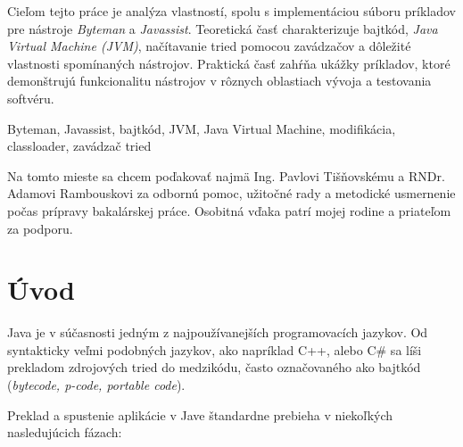 \documentclass[11pt,final,oneside]{fithesis}
\begin{document}
\FrontMatter
\ThesisTitlePage

\begin{ThesisDeclaration}
\DeclarationText
\AdvisorName
\end{ThesisDeclaration}

\begin{ThesisAbstract}
Cieľom tejto práce je analýza vlastností, spolu s implementáciou súboru
príkladov pre nástroje \textit{Byteman} a \textit{Javassist}. Teoretická časť 
charakterizuje bajtkód, \textit{Java Virtual Machine (JVM)}, načítavanie tried
pomocou zavádzačov a dôležité vlastnosti spomínaných nástrojov. Praktická časť 
zahŕňa ukážky príkladov, ktoré demonštrujú funkcionalitu nástrojov v rôznych 
oblastiach vývoja a testovania softvéru.
\end{ThesisAbstract}

\begin{ThesisKeyWords}
Byteman, Javassist, bajtkód, JVM, Java Virtual Machine, modifikácia, 
classloader, zavádzač tried
\end{ThesisKeyWords}

\begin{ThesisThanks}
Na tomto mieste sa chcem poďakovať najmä Ing. Pavlovi Tišňovskému a RNDr. 
Adamovi Rambouskovi za odbornú pomoc, užitočné rady a metodické usmernenie 
počas prípravy bakalárskej práce. Osobitná vďaka patrí mojej rodine a 
priateľom za podporu.
\end{ThesisThanks}

\MainMatter
\tableofcontents

\chapter{Úvod}

Java je v súčasnosti jedným z najpoužívanejších programovacích jazykov.
Od syntakticky veľmi podobných jazykov, ako napríklad C++, alebo
C\# sa líši prekladom zdrojových tried do medzikódu, často označovaného ako
bajtkód (\textit{bytecode, p-code, portable code}).

Preklad a spustenie aplikácie v Jave štandardne prebieha v niekoľkých
nasledujúcich fázach:
\end{document}

